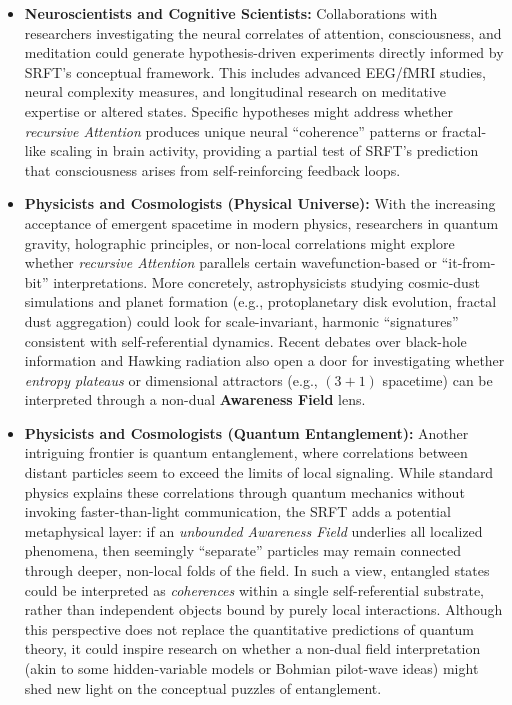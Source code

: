 \documentclass[12pt,a4paper]{article}
\begin{document}
\begin{itemize}
    \item \textbf{Neuroscientists and Cognitive Scientists:}
    Collaborations with researchers investigating the neural correlates of attention, consciousness, and meditation could generate hypothesis-driven experiments directly informed by SRFT’s conceptual framework. This includes advanced EEG/fMRI studies, neural complexity measures, and longitudinal research on meditative expertise or altered states. Specific hypotheses might address whether \emph{recursive Attention} produces unique neural “coherence” patterns or fractal-like scaling in brain activity, providing a partial test of SRFT’s prediction that consciousness arises from self-reinforcing feedback loops.

    \item \textbf{Physicists and Cosmologists (Physical Universe):}
    With the increasing acceptance of emergent spacetime in modern physics, researchers in quantum gravity, holographic principles, or non-local correlations might explore whether \emph{recursive Attention} parallels certain wavefunction-based or “it-from-bit” interpretations. More concretely, astrophysicists studying cosmic-dust simulations and planet formation (e.g., protoplanetary disk evolution, fractal dust aggregation) could look for scale-invariant, harmonic “signatures” consistent with self-referential dynamics. Recent debates over black-hole information and Hawking radiation also open a door for investigating whether \emph{entropy plateaus} or dimensional attractors (e.g., \((3+1)\) spacetime) can be interpreted through a non-dual \textbf{Awareness Field} lens.

    \item \textbf{Physicists and Cosmologists (Quantum Entanglement):}
    Another intriguing frontier is quantum entanglement, where correlations between distant particles seem to exceed the limits of local signaling. While standard physics explains these correlations through quantum mechanics without invoking faster-than-light communication, the SRFT adds a potential metaphysical layer: if an \emph{unbounded Awareness Field} underlies all localized phenomena, then seemingly “separate” particles may remain connected through deeper, non-local folds of the field. In such a view, entangled states could be interpreted as \emph{coherences} within a single self-referential substrate, rather than independent objects bound by purely local interactions. Although this perspective does not replace the quantitative predictions of quantum theory, it could inspire research on whether a non-dual field interpretation (akin to some hidden-variable models or Bohmian pilot-wave ideas) might shed new light on the conceptual puzzles of entanglement.


\end{itemize}
\end{document}
